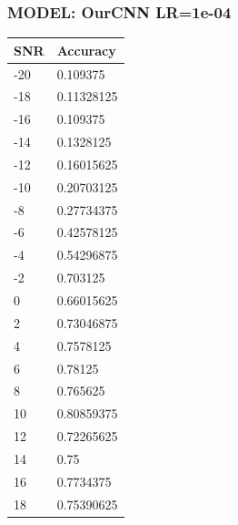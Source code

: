 \documentclass[12pt,a4paper]{article}
\begin{document}
    \subsubsection{MODEL: OurCNN LR=1e-04}
    \begin{table}[!ht]
    \raggedright
    \begin{tabular}{|l|l|}
    \hline
        SNR & Accuracy \\ \hline
        -20 & 0.109375 \\ \hline
        -18 & 0.11328125 \\ \hline
        -16 & 0.109375 \\ \hline
        -14 & 0.1328125 \\ \hline
        -12 & 0.16015625 \\ \hline
        -10 & 0.20703125 \\ \hline
        -8 & 0.27734375 \\ \hline
        -6 & 0.42578125 \\ \hline
        -4 & 0.54296875 \\ \hline
        -2 & 0.703125 \\ \hline
        0 & 0.66015625 \\ \hline
        2 & 0.73046875 \\ \hline
        4 & 0.7578125 \\ \hline
        6 & 0.78125 \\ \hline
        8 & 0.765625 \\ \hline
        10 & 0.80859375 \\ \hline
        12 & 0.72265625 \\ \hline
        14 & 0.75 \\ \hline
        16 & 0.7734375 \\ \hline
        18 & 0.75390625 \\ \hline
    \end{tabular}
\end{table}
    \newpage
\end{document}
